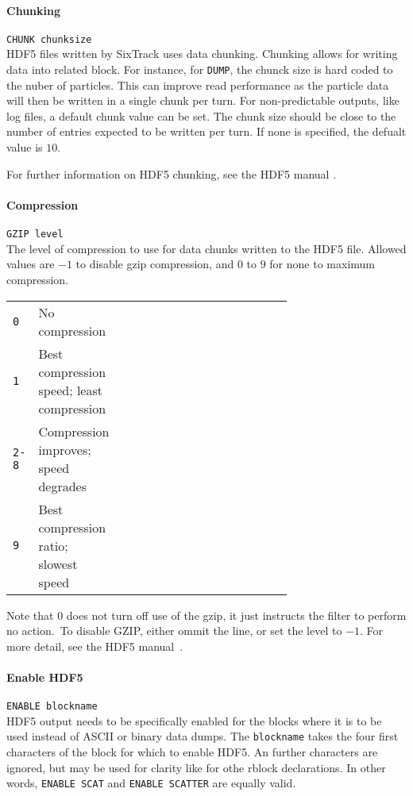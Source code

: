 \paragraph{Chunking} \texttt{CHUNK chunksize}\\

HDF5 files written by SixTrack uses data chunking.
Chunking allows for writing data into related block.
For instance, for \texttt{DUMP}, the chunck size is hard coded to the nuber of particles.
This can improve read performance as the particle data will then be written in a single chunk per turn.
For non-predictable outputs, like log files, a default chunk value can be set.
The chunk size should be close to the number of entries expected to be written per turn.
If none is specified, the defualt value is $10$.

For further information on HDF5 chunking, see the HDF5 manual \cite{h5_doc}.

\paragraph{Compression} \texttt{GZIP level}\\

The level of compression to use for data chunks written to the HDF5 file.
Allowed values are $-1$ to disable gzip compression, and $0$ to $9$ for none to maximum compression.

\bigskip
\begin{tabular}{@{}llp{0.7\linewidth}}
    \texttt{0}   & No compression \\
    \texttt{1}   & Best compression speed; least compression \\
    \texttt{2-8} & Compression improves; speed degrades \\
    \texttt{9}   & Best compression ratio; slowest speed
\end{tabular}

\bigskip
Note that $0$ does not turn off use of the gzip, it just instructs the filter to perform no action.\
To disable GZIP, either ommit the line, or set the level to $-1$.
For more detail, see the HDF5 manual~\cite{h5_doc}.

\paragraph{Enable HDF5} \texttt{ENABLE blockname}\\

HDF5 output needs to be specifically enabled for the blocks where it is to be used instead of ASCII or binary data dumps.
The \texttt{blockname} takes the four first characters of the block for which to enable HDF5.
An further characters are ignored, but may be used for clarity like for othe rblock declarations.
In other words, \texttt{ENABLE SCAT} and \texttt{ENABLE SCATTER} are equally valid.

